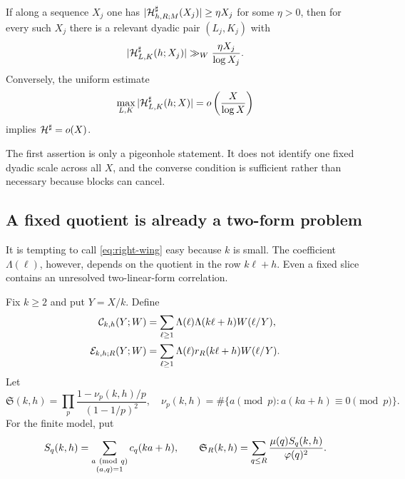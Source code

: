\begin{corollary}
\label{cor:dyadic-witness}
If along a sequence $X_j$ one has
$|\mathcal H^\sharp_{h,R;M}(X_j)|\ge\eta X_j$ for some $\eta>0$, then for every
such $X_j$ there is a relevant dyadic pair $(L_j,K_j)$ with
\begin{equation}
 |\mathcal H^\sharp_{L,K}(h;X_j)|
 \gg_W\frac{\eta X_j}{\log X_j}.
 \label{eq:dyadic-witness-bound}
\end{equation}
Conversely, the uniform estimate
\begin{equation}
 \max_{L,K}|\mathcal H^\sharp_{L,K}(h;X)|
 =o\left(\frac X{\log X}\right)
 \label{eq:uniform-block-sufficient}
\end{equation}
implies $\mathcal H^\sharp=o(X)$.
\end{corollary}

The first assertion is only a pigeonhole statement.  It does not identify
one fixed dyadic scale across all $X$, and the converse condition is
sufficient rather than necessary because blocks can cancel.

\subsection{A fixed quotient is already a two-form problem}

It is tempting to call \eqref{eq:right-wing} easy because $k$ is small.
The coefficient $\Lambda(\ell)$, however, depends on the quotient in the
row $k\ell+h$.  Even a fixed slice contains an unresolved two-linear-form
correlation.

Fix $k\ge2$ and put $Y=X/k$.  Define
\begin{align}
 \mathcal C_{k,h}(Y;W)
 &=\sum_{\ell\ge1}\Lambda(\ell)\Lambda(k\ell+h)W(\ell/Y),
 \label{eq:two-form-correlation}\\
 \mathcal E_{k,h;R}(Y;W)
 &=\sum_{\ell\ge1}\Lambda(\ell)r_R(k\ell+h)W(\ell/Y).
 \label{eq:fixed-k-residual-slice}
\end{align}
Let
\begin{equation}
 \mathfrak S(k,h)=
 \prod_p\frac{1-\nu_p(k,h)/p}{(1-1/p)^2},
 \quad
 \nu_p(k,h)=
 \#\{a\pmod p:a(ka+h)\equiv0\pmod p\}.
 \label{eq:two-form-singular-series}
\end{equation}
For the finite model, put
\begin{equation}
 S_q(k,h)=
 \sum_{\substack{a\ ({\rm mod}\ q)\\(a,q)=1}}c_q(ka+h),
 \qquad
 \mathfrak S_R(k,h)=
 \sum_{q\le R}\frac{\mu(q)S_q(k,h)}{\varphi(q)^2}.
 \label{eq:finite-two-form-singular-series}
\end{equation}

